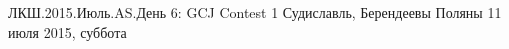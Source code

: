 \documentclass [11pt, a4paper, oneside] {article}
\begin{document}
\contest
{ЛКШ.2015.Июль.AS.День 6: GCJ Contest 1}%
{Судиславль, Берендеевы Поляны}%
{11 июля 2015, суббота}%


\renewcommand{\t}{\texttt}
\end{document}
